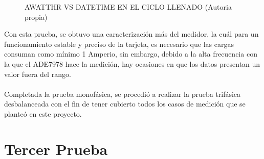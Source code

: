 \begin{figure}[H]
  \hfill
  \hfill
  \caption{AWATTHR VS DATETIME EN EL CICLO LLENADO (Autoria propia)}
  \end{figure}

  Con esta prueba, se obtuvo una caracterización más del medidor, la cuál para un funcionamiento estable y preciso de la tarjeta, es necesario que las cargas consuman como mínimo 1 Amperio, sin embargo, debido a la alta frecuencia con la que el ADE7978 hace la medición, hay ocasiones en que los datos presentan un valor fuera del rango. \\\\
  Completada la prueba monofásica, se procedió a realizar la prueba trifásica desbalanceada con el fin de tener cubierto todos los casos de medición que se planteó en este proyecto.
  \section{Tercer Prueba}

